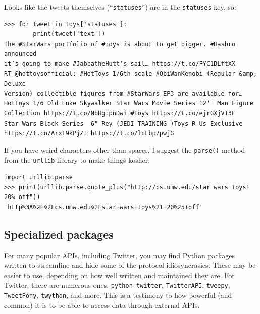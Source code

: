 Looks like the tweets themselves (``\texttt{statuses}'') are in the
\texttt{statuses} key, so:

\small
\begin{Verbatim}[fontsize=\footnotesize,samepage=true,frame=single]
>>> for tweet in toys['statuses']:
        print(tweet['text'])
The #StarWars portfolio of #toys is about to get bigger. #Hasbro announced
it’s going to make #JabbatheHutt’s sail… https://t.co/FYC1DLftXX
RT @hottoysofficial: #HotToys 1/6th scale #ObiWanKenobi (Regular &amp; Deluxe
Version) collectible figures from #StarWars EP3 are available for…
HotToys 1/6 Old Luke Skywalker Star Wars Movie Series 12'' Man Figure
Collection https://t.co/NbHgtpnDwi #Toys https://t.co/ejrGXjVT3F
Star Wars Black Series  6" Rey (JEDI TRAINING )Toys R Us Exclusive
https://t.co/ArxT9kPjZt https://t.co/lcLbp7pwjG
\end{Verbatim}
\normalsize


If you have weird characters other than spaces, I suggest the \texttt{parse()}
method from the \texttt{urllib} library to make things kosher:

\begin{Verbatim}[fontsize=\footnotesize,samepage=true,frame=single]
import urllib.parse
>>> print(urllib.parse.quote_plus("http://cs.umw.edu/star wars toys! 20% off"))
'http%3A%2F%2Fcs.umw.edu%2Fstar+wars+toys%21+20%25+off'
\end{Verbatim}


\subsection{Specialized packages}

For many popular APIs, including Twitter, you may find Python packages written
to streamline and hide some of the protocol idiosyncrasies. These may be
easier to use, depending on how well written and maintained they are. For
Twitter, there are numerous ones: \texttt{python-twitter},
\texttt{TwitterAPI}, \texttt{tweepy}, \texttt{TweetPony}, \texttt{twython},
and more. This is a testimony to how powerful (and common) it is to be able to
access data through external APIs.



